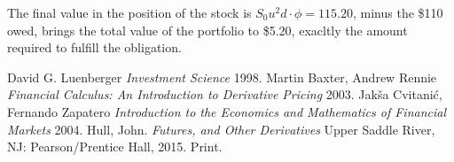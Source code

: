 \documentclass{article}
\begin{document}
The final value in the position of the stock is $S_0 u ^ 2 d \cdot \phi = 115.20$, minus the \$110 owed, brings the total value of the portfolio to \$5.20, exacltly the amount required to fulfill the obligation.

\newpage
\begin{thebibliography}{1}

   David G. Luenberger {\em Investment Science}  1998.
   Martin Baxter, Andrew Rennie {\em Financial Calculus: An Introduction to Derivative Pricing} 2003.
   Jakša Cvitanić, Fernando Zapatero {\em Introduction to the Economics and Mathematics of Financial Markets} 2004.
   Hull, John. {\em Futures, and Other Derivatives} Upper Saddle River, NJ: Pearson/Prentice Hall, 2015. Print.

\end{thebibliography}
\end{document}
